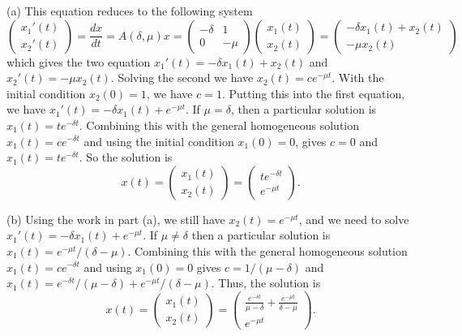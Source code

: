 \documentclass{article}
\begin{document}
(a) This equation reduces to the following system
\[
\left (
\begin{array}{c}
x_1'(t)\\
x_2'(t)
\end{array}
\right )
= \frac{dx}{dt} = A(\delta , \mu) x =
\left (
\begin{array}{cc}
- \delta & 1\\
0 & - \mu
\end{array}
\right ) \left (
\begin{array}{c}
x_1(t)\\
x_2(t)
\end{array}
\right ) = \left (
\begin{array}{c}
- \delta x_1(t) + x_2(t)\\
- \mu x_2(t)
\end{array}
\right )
\]
which gives the two equation $x_1'(t) = -\delta x_1(t) + x_2(t)$ and $x_2'(t) = - \mu x_2(t)$. Solving the second we have $x_2(t) = ce^{-\mu t}$. With the initial condition $x_2(0) = 1$, we have $c = 1$. Putting this into the first equation, we have $x_1'(t) = -\delta x_1(t) + e^{-\mu t}$. If $\mu = \delta$, then a particular solution is $x_1(t) = te^{-\delta t}$. Combining this with the general homogeneous solution $x_1(t) = ce^{-\delta t}$ and using the initial condition $x_1(0) = 0$, gives $c = 0$ and $x_1(t) = te^{-\delta t}$. So the solution is
\[
x(t) = \left (
\begin{array}{c}
x_1(t)\\
x_2(t)
\end{array}
\right ) = \left (
\begin{array}{c}
te^{- \delta t}\\
e^{-\mu t}
\end{array}
\right ).
\]

(b) Using the work in part (a), we still have $x_2(t) = e^{-\mu t}$, and we need to solve $x_1'(t) = -\delta x_1(t) + e^{-\mu t}$. If $\mu \neq \delta$ then a particular solution is $x_1(t) = e^{-\mu t}/(\delta - \mu)$. Combining this with the general homogeneous solution $x_1(t) = ce^{-\delta t}$ and using $x_1(0) = 0$ gives $c = 1/(\mu - \delta)$ and $x_1(t) = e^{-\delta t}/(\mu - \delta) + e^{-\mu t}/(\delta - \mu)$. Thus, the solution is
\[
x(t) = \left (
\begin{array}{c}
x_1(t)\\
x_2(t)
\end{array}
\right ) = \left (
\begin{array}{c}
\frac{e^{-\delta t}}{\mu - \delta} + \frac{e^{-\mu t}}{\delta - \mu}\\
e^{-\mu t}
\end{array}
\right ).
\]
\end{document}

